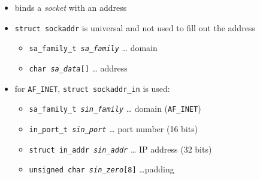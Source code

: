 \begin{slide}
\begin{itemize}
\item binds a \emph{socket} with an address
\item \texttt{struct sockaddr} is universal and not used to fill out the address
    \begin{itemize}
    \item \texttt{sa\_family\_t \emph{sa\_family}} \dots{} domain
    \item \texttt{char \emph{sa\_data}[]} \dots{} address
    \end{itemize}
\item for \texttt{AF\_INET}, \texttt{struct sockaddr\_in} is used:
    \begin{itemize}
    \item \texttt{sa\_family\_t \emph{sin\_family}} \dots{} domain
    (\texttt{AF\_INET}) 
    \item \texttt{in\_port\_t \emph{sin\_port}} \dots{} port number (16 bits) 
    \item \texttt{struct in\_addr \emph{sin\_addr}} \dots{} IP address (32 bits)
    \item \texttt{unsigned char \emph{sin\_zero}[8]} \dots padding
    \end{itemize}
\end{itemize}
\end{slide}

